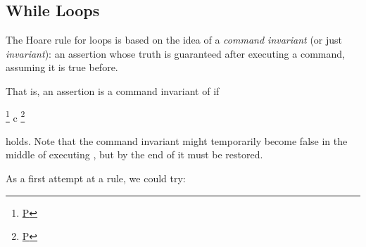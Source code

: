 \documentclass[12pt]{report}
\begin{document}
\subsection{While Loops}



 The Hoare rule for  loops is based on the idea of a
    \textit{command invariant} (or just \textit{invariant}): an assertion whose
    truth is guaranteed after executing a command, assuming it is true
    before.


    That is, an assertion  is a command invariant of  if


      \footnote{\url{P}} c \footnote{\url{P}}


    holds.  Note that the command invariant might temporarily become
    false in the middle of executing , but by the end of  it
    must be restored. 

  As a first attempt at a  rule, we could try:
\end{document}
